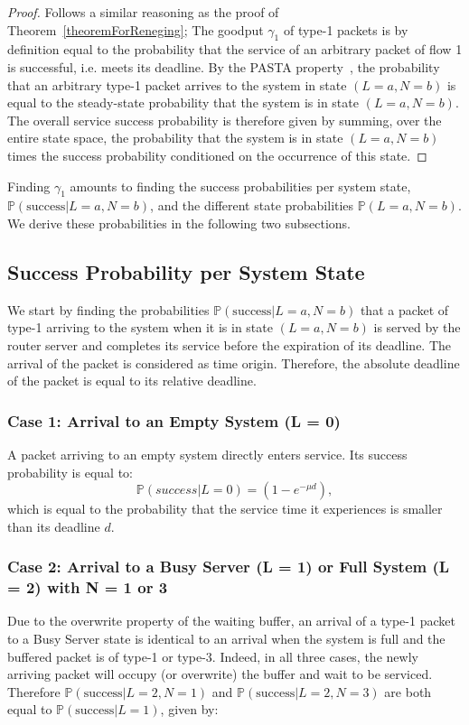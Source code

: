 \documentclass[preprint,12pt]{elsarticle}
\theoremstyle{definition}
\theoremstyle{plain}
\theoremstyle{remark}
\renewcommand{\P}{\ensuremath{\mathbb{P}}}
\newcommand{\e}{e}
\begin{document}
\begin{proof}
Follows a similar reasoning as the proof of Theorem~\ref{theoremForReneging}; The goodput $\gamma_{1}$ of type-1 packets is by definition equal to the probability that the service of an arbitrary packet of flow 1 is successful, i.e. meets its deadline. By the PASTA property~\cite{wolff_poisson_1982}, the probability that an arbitrary type-1 packet arrives to the system in state $(L=a,N=b)$ is equal to the steady-state probability that the system is in state $(L=a,N=b)$. The overall service success probability is therefore given by summing, over the entire state space, the probability that the system is in state $(L = a, N = b)$ times the success probability conditioned on the occurrence of this state.
\end{proof}
\smallskip
Finding $\gamma_{1}$ amounts to finding the success probabilities per system state, $\P(\mbox{success}|L = a, N = b)$, and the different state probabilities $\P(L = a, N = b)$. We derive these probabilities in the following two subsections.

\subsection*{Success Probability per System State}

We start by finding the probabilities $\P(\mbox{success}|L = a, N = b)$ that a packet of type-1 arriving to the system when it is in state $(L = a, N = b)$ is served by the router server and completes its service before the expiration of its deadline. The arrival of the packet is considered as time origin. Therefore, the absolute deadline of the packet is equal to its relative deadline.

\smallskip
\subsubsection*{Case 1: Arrival to an Empty System (L = 0)}

A packet arriving to an empty system directly enters service. Its success probability is equal to:
\begin{equation}\label{eq:PsuccessL0}
    \P(success|L  = 0) = (1 - \e^{-\mu d}),
  \end{equation}
which is equal to the probability that the service time it experiences is smaller than its deadline $d$.

\smallskip
\subsubsection*{Case 2: Arrival to a Busy Server (L = 1) or Full System (L = 2) with N = 1 or 3}
Due to the overwrite property of the waiting buffer, an arrival of a type-1 packet to a Busy Server state is identical to an arrival when the system is full and the buffered packet is of type-1 or type-3. Indeed, in all three cases, the newly arriving packet will occupy (or overwrite) the buffer and wait to be serviced. Therefore $\P(\mbox{success}|L = 2, N = 1)$ and $\P(\mbox{success}|L = 2, N = 3)$ are both equal to $\P(\mbox{success}|L = 1)$, given by:
\end{document}
